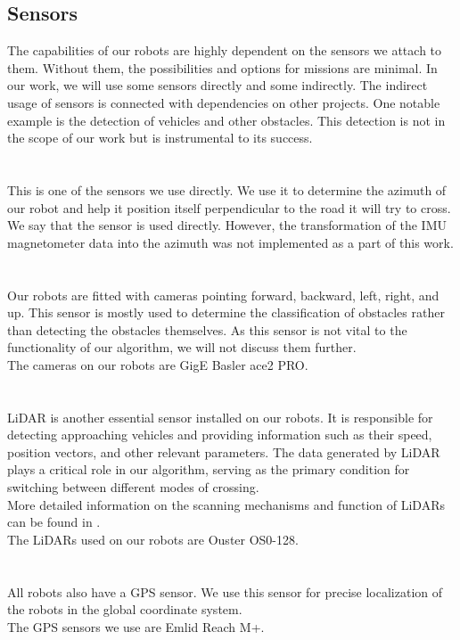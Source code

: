     \subsection{Sensors}
        The capabilities of our robots are highly dependent on the sensors we attach to them. Without them, the possibilities and options for missions are minimal. In our work, we will use some sensors directly and some indirectly. The indirect usage of sensors is connected with dependencies on other projects. One notable example is the detection of vehicles and other obstacles. This detection is not in the scope of our work but is instrumental to its success.\\\\
        \\
            This is one of the sensors we use directly. We use it to determine the azimuth of our robot and help it position itself perpendicular to the road it will try to cross.\\
            We say that the sensor is used directly. However, the transformation of the IMU magnetometer data into the azimuth was not implemented as a part of this work.\\\\
        \\
            Our robots are fitted with cameras pointing forward, backward, left, right, and up. This sensor is mostly used to determine the classification of obstacles rather than detecting the obstacles themselves. As this sensor is not vital to the functionality of our algorithm, we will not discuss them further.\\
            The cameras on our robots are GigE Basler ace2 PRO.\\\\
        \\
            LiDAR is another essential sensor installed on our robots. It is responsible for detecting approaching vehicles and providing information such as their speed, position vectors, and other relevant parameters. The data generated by LiDAR plays a critical role in our algorithm, serving as the primary condition for switching between different modes of crossing.\\
            More detailed information on the scanning mechanisms and function of LiDARs can be found in \cite{LiDAR}.\\
            The LiDARs used on our robots are Ouster OS0-128.\\\\
        \\
            All robots also have a GPS sensor. We use this sensor for precise localization of the robots in the global coordinate system.\\
            The GPS sensors we use are Emlid Reach M+.
